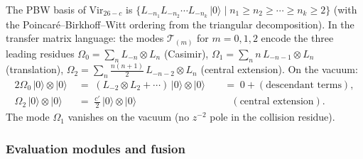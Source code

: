\begin{remark}
\label{rem:virasoro-triple-pole-pbw}
The PBW basis of $\mathrm{Vir}_{26-c}$ is
$\{L_{-n_1} L_{-n_2} \cdots L_{-n_k}\,|0\rangle
\mid n_1 \ge n_2 \ge \cdots \ge n_k \ge 2\}$
(with the Poincar\'e--Birkhoff--Witt ordering from the
triangular decomposition). In the transfer matrix language:
the modes $\mathcal{T}_{(m)}$ for $m = 0, 1, 2$
encode the three leading residues
$\Omega_0 = \sum_n L_{-n} \otimes L_n$ (Casimir),
$\Omega_1 = \sum_n n\, L_{-n-1} \otimes L_n$ (translation),
$\Omega_2 = \sum_n \tfrac{n(n+1)}{2}\,L_{-n-2} \otimes L_n$
(central extension).
On the vacuum:
\begin{alignat*}{2}
\Omega_0\,|0\rangle \otimes |0\rangle
&\;=\;
(L_{-2} \otimes L_2 + \cdots)\,|0\rangle \otimes |0\rangle
&&\;=\; 0 + (\text{descendant terms}),
\\
\Omega_2\,|0\rangle \otimes |0\rangle
&\;=\;
\tfrac{c'}{2}\,|0\rangle \otimes |0\rangle
&&\quad (\text{central extension}).
\end{alignat*}
The mode $\Omega_1$ vanishes on the vacuum
(no $z^{-2}$ pole in the collision residue).
\end{remark}

\subsubsection{Evaluation modules and fusion}
\label{subsubsec:virasoro-eval-fusion}

